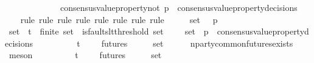 \begin{isabellebody}
\ \ \ \ \ \ \ \ \ \ \ \ {\isasymlongrightarrow}\ consensus{\isacharunderscore}value{\isacharunderscore}property{\isacharunderscore}not\ p\ {\isasymnotin}\ consensus{\isacharunderscore}value{\isacharunderscore}property{\isacharunderscore}decisions\ {\isasymsigma}{\isacharprime}{\isacharparenright}{\isachardoublequoteclose}\isanewline
%
\isadelimproof
\ \ %
\endisadelimproof
%
\isatagproof
{}\isamarkupfalse%
\ {\isacharparenleft}rule{\isacharcomma}\ rule{\isacharcomma}\ rule{\isacharcomma}\ rule{\isacharcomma}\ rule{\isacharcomma}\ rule{\isacharcomma}\ rule{\isacharcomma}\ rule{\isacharparenright}\isanewline
{}\isamarkupfalse%
\ {\isacharminus}\isanewline
\ \ \isamarkupfalse%
\ {\isasymsigma}{\isacharunderscore}set\ {\isasymsigma}\ {\isasymsigma}{\isacharprime}\ p\isanewline
\ \ \isamarkupfalse%
\ {\isachardoublequoteopen}{\isasymsigma}{\isacharunderscore}set\ {\isasymsubseteq}\ {\isasymSigma}t{\isachardoublequoteclose}\ \ {\isachardoublequoteopen}finite\ {\isasymsigma}{\isacharunderscore}set{\isachardoublequoteclose}\ \ {\isachardoublequoteopen}is{\isacharunderscore}faults{\isacharunderscore}lt{\isacharunderscore}threshold\ {\isacharparenleft}{\isasymUnion}{\isasymsigma}{\isacharunderscore}set{\isacharparenright}{\isachardoublequoteclose}\ \ {\isachardoublequoteopen}{\isacharbraceleft}{\isasymsigma}{\isacharcomma}\ {\isasymsigma}{\isacharprime}{\isacharbraceright}\ {\isasymsubseteq}\ {\isasymsigma}{\isacharunderscore}set\ {\isasymand}\ p\ {\isasymin}\ consensus{\isacharunderscore}value{\isacharunderscore}property{\isacharunderscore}decisions\ {\isasymsigma}{\isachardoublequoteclose}\ \isanewline
\ \ \isamarkupfalse%
\ {\isachardoublequoteopen}{\isasymexists}\ {\isasymsigma}{\isachardot}\ {\isasymsigma}\ {\isasymin}\ {\isasymSigma}t\ {\isasymand}\ {\isasymsigma}\ {\isasymin}\ {\isasymInter}\ {\isacharbraceleft}futures\ {\isasymsigma}\ {\isacharbar}\ {\isasymsigma}{\isachardot}\ {\isasymsigma}\ {\isasymin}\ {\isasymsigma}{\isacharunderscore}set{\isacharbraceright}{\isachardoublequoteclose}\isanewline
\ \ \ \ \isamarkupfalse%
\ n{\isacharunderscore}party{\isacharunderscore}common{\isacharunderscore}futures{\isacharunderscore}exists\ \isamarkupfalse%
\ meson\isanewline
\ \ \isamarkupfalse%
\ \isamarkupfalse%
\ {\isasymsigma}{\isacharprime}{\isacharprime}\ \ {\isachardoublequoteopen}{\isasymsigma}{\isacharprime}{\isacharprime}\ {\isasymin}\ {\isasymSigma}t\ {\isasymand}\ {\isasymsigma}{\isacharprime}{\isacharprime}\ {\isasymin}\ {\isasymInter}\ {\isacharbraceleft}futures\ {\isasymsigma}\ {\isacharbar}\ {\isasymsigma}{\isachardot}\ {\isasymsigma}\ {\isasymin}\ {\isasymsigma}{\isacharunderscore}set{\isacharbraceright}{\isachardoublequoteclose}\ \isamarkupfalse%

\end{isabellebody}
